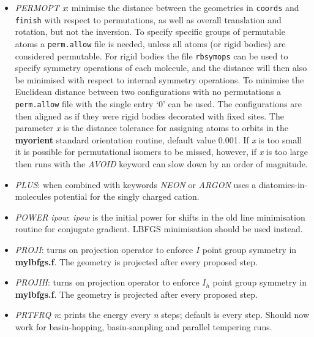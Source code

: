 \documentclass[12pt,a4paper,dvips]{article}
\begin{document}
\begin{itemize}
\item {\it PERMOPT x\/}: minimise the distance between the geometries in
{\tt coords} and {\tt finish} with respect to permutations, as well
as overall translation and rotation, but not the inversion. To specify specific groups of
permutable atoms a {\tt perm.allow} file is needed, unless all atoms (or rigid bodies)
are considered permutable.
For rigid bodies the file {\tt rbsymops} can be used to specify symmetry
operations of each molecule, and the distance will then also be
minimised with respect to internal symmetry operations.
To minimise the Euclidean distance between two configurations with no permutations
a {\tt perm.allow} file with the single entry `0' can be used. 
The configurations are then aligned as if they were rigid bodies decorated
with fixed sites.
The parameter {\it x} is the distance tolerance for assigning atoms to orbits
in the {\bf myorient} standard orientation routine, default value 0.001.
If {\it x} is too small it is possible for permutational isomers to be missed,
however, if {\it x\/} is too large then runs with the {\it AVOID\/} keyword can
slow down by an order of magnitude.

\item {\it PLUS\/}: when combined with keywords {\it NEON\/} or {\it ARGON\/}
uses a diatomics-in-molecules potential for the singly charged cation.



\item {\it POWER ipow\/}: {\it ipow\/} is the initial power for shifts in the old line minimisation routine
for conjugate gradient. LBFGS minimisation should be used instead.

\item {\it PROJI\/}: turns on projection operator to enforce $I$ point group symmetry
in {\bf mylbfgs.f}. The geometry is projected after every proposed step.

\item {\it PROJIH\/}: turns on projection operator to enforce $I_h$ point group symmetry
in {\bf mylbfgs.f}. The geometry is projected after every proposed step.

\item {\it PRTFRQ n\/}: prints the energy every {\it n\/} steps; default is every step.
Should now work for basin-hopping, basin-sampling and parallel tempering runs.


\end{itemize}
\end{document}
